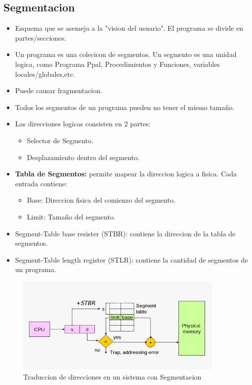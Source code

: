 \pagebreak
\subsection{Segmentacion}
\begin{itemize}
    \item Esquema que se asemeja a la "vision del usuario". El programa se divide en partes/secciones.
    \item Un programa es una colecicon de segmentos. Un segmento es una unidad logica, como Programa Ppal, Procedimientos y Funciones, variables locales/globales,etc.
    \item Puede causar fragmentacion.
    \item Todos los segmentos de un programa pueden no tener el mismo tamaño.
    \item Las direcciones logicas consisten en 2 partes:
    \begin{itemize}
        \item Selector de Segmento.
        \item Desplazamiento dentro del segmento. 
    \end{itemize}
    \item \textbf{Tabla de Segmentos:} permite mapear la direccion logica a fisica. Cada entrada contiene:
    \begin{itemize}
        \item Base: Direccion fisica del comienzo del segmento.
        \item Limit: Tamaño del segmento.
    \end{itemize}
    \item Segment-Table base resister (STBR): contiene la direccion de la tabla de segmentos.
    \item Segment-Table length register (STLR): contiene la cantidad de segmentos de un programa.
\end{itemize}
\vspace{-0.5cm}
\begin{figure}[h]
    \begin{center}
        \includegraphics[width=0.90\textwidth]{assets/SegmentationTranslation.pdf}
    \end{center}
    \caption{Traduccion de direcciones en un sistema con Segmentacion}\label{fig:}
\end{figure}
\pagebreak
